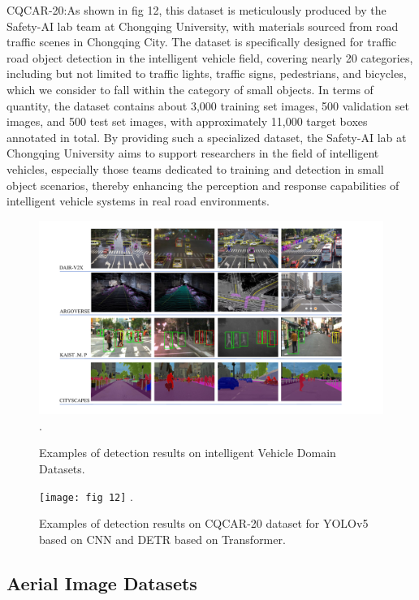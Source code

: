 \documentclass[journal]{IEEEtran}
\begin{document}
CQCAR-20:As shown in fig 12, this dataset is meticulously produced by the Safety-AI lab team at Chongqing University, with materials sourced from road traffic scenes in Chongqing City. The dataset is specifically designed for traffic road object detection in the intelligent vehicle field, covering nearly 20 categories, including but not limited to traffic lights, traffic signs, pedestrians, and bicycles, which we consider to fall within the category of small objects. In terms of quantity, the dataset contains about 3,000 training set images, 500 validation set images, and 500 test set images, with approximately 11,000 target boxes annotated in total. By providing such a specialized dataset, the Safety-AI lab at Chongqing University aims to support researchers in the field of intelligent vehicles, especially those teams dedicated to training and detection in small object scenarios, thereby enhancing the perception and response capabilities of intelligent vehicle systems in real road environments.

\begin{figure}[htbp]
	\centering
	\setlength{\abovecaptionskip}{-0.6cm}
	\includegraphics[width=\textwidth]{fig 11}
	\DeclareGraphicsExtensions.
	\caption{Examples of detection results on intelligent Vehicle Domain Datasets.}
	\label{fig 1}
\end{figure}


\begin{figure}[htbp]
	\centering
	\setlength{\abovecaptionskip}{-0.6cm}
	\texttt{[image: fig 12]}
	\DeclareGraphicsExtensions.
	\caption{Examples of detection results on CQCAR-20 dataset for YOLOv5 based on CNN and DETR based on Transformer.}
	\label{fig 1}
\end{figure}

\subsection{Aerial Image Datasets}
\end{document}
